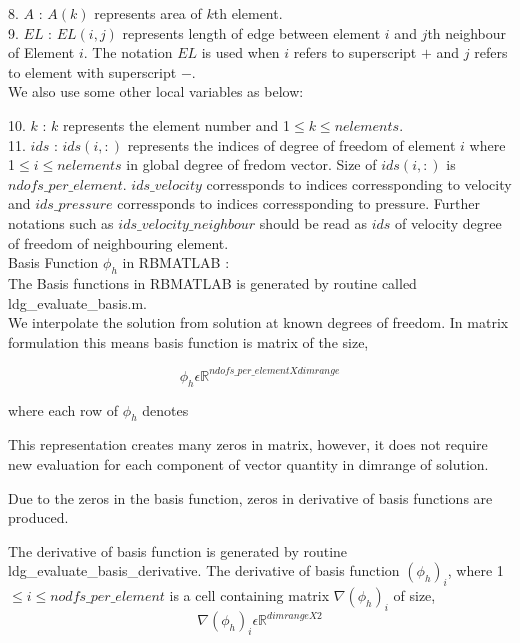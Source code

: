 \documentclass[a4paper,10pt]{book}
\begin{document}
8. $A$ : $A(k)$ represents area of $k$th element.\\

9. $EL$ : $EL(i,j)$ represents length of edge between element $i$ and $j$th neighbour of Element $i$. The notation $EL$ is used when $i$ refers to superscript $+$ and $j$ refers to element with superscript $-$.\\

We also use some other local variables as below:

10. $k$ : $k$ represents the element number and 1$\leq k \leq nelements$.\\

11. $ids$ : $ids(i,:)$ represents the indices of degree of freedom of element $i$ where 1$\leq i \leq nelements$ in global degree of fredom vector. Size of $ids(i,:)$ is $ndofs\_per\_element$. $ids\_velocity$ corressponds to indices corressponding to velocity and $ids\_pressure$ corressponds to indices corressponding to pressure. Further notations such as $ids\_velocity\_neighbour$ should be read as $ids$ of velocity degree of freedom of neighbouring element.\\

Basis Function $\phi_h$ in RBMATLAB :\\

The Basis functions in RBMATLAB is generated by routine called ldg\_evaluate\_basis.m.\\

We interpolate the solution from solution at known degrees of freedom. In matrix formulation this means basis function is matrix of the size,

\begin{equation}\label{basis_func_rbmatlab}
\phi_h \epsilon \mathbb{R}^{ndofs\_per\_element X dimrange}
\end{equation}

where each row of $\phi_h$ denotes 

This representation creates many zeros in matrix, however, it does not require new evaluation for each component of vector quantity in dimrange of solution.

Due to the zeros in the basis function, zeros in derivative of basis functions are produced. 

The derivative of basis function is generated by routine ldg\_evaluate\_basis\_derivative. The derivative of basis function $(\phi_h)_{i}$, where 1$\leq i \leq nodfs\_per\_element$ is a cell containing matrix $\nabla (\phi_h)_{i}$ of size,
\begin{equation}\label{basis_func_derivative_rbmatlab}
\nabla (\phi_h)_{i} \epsilon \mathbb{R}^{{dimrange} X 2}
\end{equation}
\end{document}
